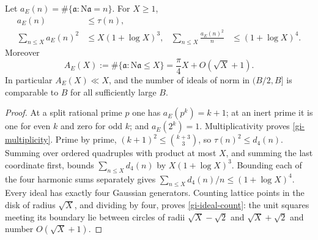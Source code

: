 \begin{lemma}\label{gi-moments}
Let $a_E(n)=\#\{\mathfrak a:\mathrm N\mathfrak a=n\}$.  For $X\geq1$,
\begin{align}
 a_E(n)&\leq\tau(n),\label{gi-multiplicity}\\
 \sum_{n\leq X}a_E(n)^2&\leq X(1+\log X)^3,&
 \sum_{n\leq X}\frac{a_E(n)^2}{n}&\leq(1+\log X)^4.\label{gi-two-moments}
\end{align}
Moreover
\begin{equation}\label{gi-ideal-count}
 A_E(X):=\#\{\mathfrak a:\mathrm N\mathfrak a\leq X\}
       =\frac{\pi}{4}X+O(\sqrt X+1).
\end{equation}
In particular $A_E(X)\ll X$, and the number of ideals of norm in
$(B/2,B]$ is comparable to $B$ for all sufficiently large $B$.
\end{lemma}
\begin{proof}
At a split rational prime $p$ one has $a_E(p^k)=k+1$; at an inert prime
it is one for even $k$ and zero for odd $k$; and $a_E(2^k)=1$.
Multiplicativity proves \eqref{gi-multiplicity}.  Prime by prime,
$(k+1)^2\leq\binom{k+3}{3}$, so $\tau(n)^2\leq d_4(n)$.
Summing over ordered quadruples with product at most $X$, and summing
the last coordinate first, bounds $\sum_{n\leq X}d_4(n)$ by
$X(1+\log X)^3$.  Bounding each of the four harmonic sums separately
gives $\sum_{n\leq X}d_4(n)/n\leq(1+\log X)^4$.
Every ideal has exactly four Gaussian generators.  Counting lattice
points in the disk of radius $\sqrt X$, and dividing by four, proves
\eqref{gi-ideal-count}: the unit squares meeting its boundary lie
between circles of radii $\sqrt X-\sqrt2$ and $\sqrt X+\sqrt2$ and
number $O(\sqrt X+1)$.
\end{proof}

